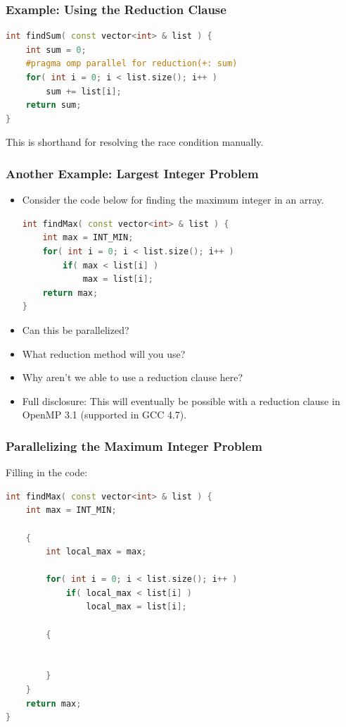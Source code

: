 \documentclass[table]{beamer}
\begin{document}
\begin{frame}[fragile]
    \frametitle{Example: Using the Reduction Clause}
\begin{lstlisting}[language=C++]
int findSum( const vector<int> & list ) {
    int sum = 0;
    #pragma omp parallel for reduction(+: sum)
    for( int i = 0; i < list.size(); i++ )
        sum += list[i];
    return sum;
}
\end{lstlisting}
    \pause
    This is shorthand for resolving the race condition manually.
\end{frame}

\begin{frame}[fragile]
    \frametitle{Another Example: Largest Integer Problem}
    \begin{itemize}
        \item<1-> Consider the code below for finding the maximum integer 
        in an array.
\begin{lstlisting}[language=C++,basicstyle=\scriptsize]
int findMax( const vector<int> & list ) {
    int max = INT_MIN;
    for( int i = 0; i < list.size(); i++ )
        if( max < list[i] )
            max = list[i];
    return max;
}
\end{lstlisting}
        \item<2-> Can this be parallelized?
        \item<3-> What reduction method will you use?
        \item<4-> Why aren't we able to use a reduction clause here?
        \item<5-> Full disclosure: This will eventually be possible with a 
        reduction clause in OpenMP 3.1 (supported in GCC 4.7).
    \end{itemize}
\end{frame}


\begin{frame}[fragile]
    \frametitle{Parallelizing the Maximum Integer Problem}
    Filling in the code:
\begin{lstlisting}[language=C++,basicstyle=\scriptsize]
int findMax( const vector<int> & list ) {
    int max = INT_MIN;

    {
        int local_max = max;

        for( int i = 0; i < list.size(); i++ )
            if( local_max < list[i] )
                local_max = list[i];

        {


        }
    }
    return max;
}
\end{lstlisting}
\end{frame}
\end{document}
